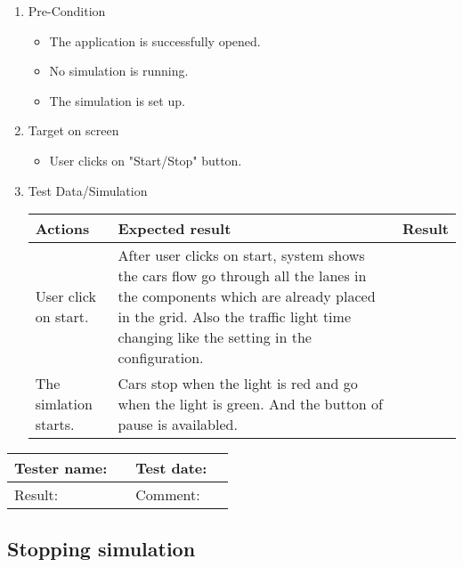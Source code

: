 \begin{enumerate}
	\item Pre-Condition
	\begin{itemize}
		\item The application is successfully opened.
		\item No simulation is running.
		\item The simulation is set up.
	\end{itemize}
	\item Target on screen
	\begin{itemize}
		\item User clicks on "Start/Stop" button.
	\end{itemize}
	\item Test Data/Simulation
	
	\begin{tabularx}{\textwidth}{|X|X|p{2.5cm}|}\hline
		Actions & Expected result & Result \\\hline
		User click on start. & After user clicks on start, system shows the cars flow go through all the lanes in the components which are already placed in the grid. Also the traffic light time changing like the setting in the configuration. & \pass \\\hline
		The simlation starts. &	Cars stop when the light is red and go when the light is green. And the button of pause is availabled. & \pass \\\hline	
	\end{tabularx}
\end{enumerate}

\begin{tabularx}{\textwidth}{|p{3cm}X|p{3cm}X|}\hline
	Tester name: &  & Test date: & \\\hline
	Result: &   \pass & Comment: & \\\hline
\end{tabularx}

\newpage

\subsection{Stopping  simulation}

